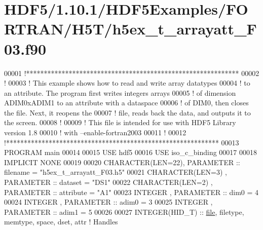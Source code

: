 \hypertarget{_h_d_f5_21_810_81_2_h_d_f5_examples_2_f_o_r_t_r_a_n_2_h5_t_2h5ex__t__arrayatt___f03_8f90_source}{}\section{H\+D\+F5/1.10.1/\+H\+D\+F5\+Examples/\+F\+O\+R\+T\+R\+A\+N/\+H5\+T/h5ex\+\_\+t\+\_\+arrayatt\+\_\+\+F03.f90}
\label{_h_d_f5_21_810_81_2_h_d_f5_examples_2_f_o_r_t_r_a_n_2_h5_t_2h5ex__t__arrayatt___f03_8f90_source}

\begin{DoxyCode}
00001 \textcolor{comment}{!************************************************************}
00002 \textcolor{comment}{!}
00003 \textcolor{comment}{!  This example shows how to read and write array datatypes}
00004 \textcolor{comment}{!  to an attribute.  The program first writes integers arrays}
00005 \textcolor{comment}{!  of dimension ADIM0xADIM1 to an attribute with a dataspace}
00006 \textcolor{comment}{!  of DIM0, then closes the  file.  Next, it reopens the}
00007 \textcolor{comment}{!  file, reads back the data, and outputs it to the screen.}
00008 \textcolor{comment}{!}
00009 \textcolor{comment}{!  This file is intended for use with HDF5 Library version 1.8}
00010 \textcolor{comment}{!  with --enable-fortran2003 }
00011 \textcolor{comment}{!}
00012 \textcolor{comment}{!************************************************************}
00013 \textcolor{keyword}{PROGRAM} main
00014 
00015   \textcolor{keywordtype}{USE }hdf5
00016   \textcolor{keywordtype}{USE }iso\_c\_binding
00017   
00018   \textcolor{keywordtype}{IMPLICIT NONE}
00019 
00020   \textcolor{keywordtype}{CHARACTER(LEN=22)}, \textcolor{keywordtype}{PARAMETER} :: filename  = \textcolor{stringliteral}{"h5ex\_t\_arrayatt\_F03.h5"}
00021   \textcolor{keywordtype}{CHARACTER(LEN=3)} , \textcolor{keywordtype}{PARAMETER} :: dataset   = \textcolor{stringliteral}{"DS1"}
00022   \textcolor{keywordtype}{CHARACTER(LEN=2)} , \textcolor{keywordtype}{PARAMETER} :: attribute = \textcolor{stringliteral}{"A1"}
00023   \textcolor{keywordtype}{INTEGER}          , \textcolor{keywordtype}{PARAMETER} :: dim0      = 4
00024   \textcolor{keywordtype}{INTEGER}          , \textcolor{keywordtype}{PARAMETER} :: adim0     = 3
00025   \textcolor{keywordtype}{INTEGER}          , \textcolor{keywordtype}{PARAMETER} :: adim1     = 5
00026 
00027   \textcolor{keywordtype}{INTEGER(HID\_T)}  :: \hyperlink{structfile}{file}, filetype, memtype, space, dset, attr \textcolor{comment}{! Handles}

\end{DoxyCode}
